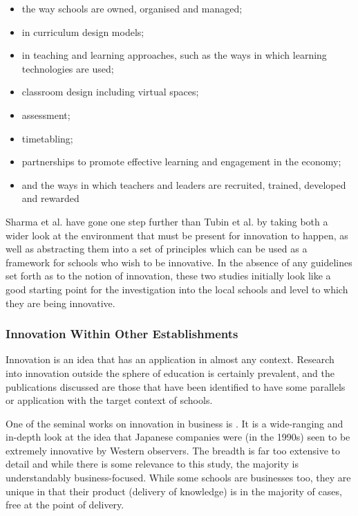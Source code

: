 \documentclass[11pt]{article}
\begin{document}
\begin{itemize}
	\item the way schools are owned, organised and managed; 
	\item in curriculum design models; 
	\item in teaching and learning approaches, such as the ways in which learning technologies are used; 
	\item classroom design including virtual spaces; 
	\item assessment; 
	\item timetabling; 
	\item partnerships to promote effective learning and engagement in the economy; 
	\item and the ways in which teachers and leaders are recruited, trained, developed and rewarded
\end{itemize}

Sharma et al. have gone one step further than Tubin et al. by taking both a wider look at the environment that must be present for innovation to happen, as well as abstracting them into a set of principles which can be used as a framework for schools who wish to be innovative. In the absence of any guidelines set forth as to the notion of innovation, these two studies initially look like a good starting point for the investigation into the local schools and level to which they are being innovative.

\subsubsection{Innovation Within Other Establishments}
Innovation is an idea that has an application in almost any context. Research into innovation outside the sphere of education is certainly prevalent, and the publications discussed are those that have been identified to have some parallels or application with the target context of schools.

One of the seminal works on innovation in business is \citet{nonaka1995knowledge}. It is a wide-ranging and in-depth look at the idea that Japanese companies were (in the 1990s) seen to be extremely innovative by Western observers. The breadth is far too extensive to detail and while there is some relevance to this study, the majority is understandably business-focused. While some schools are businesses too, they are unique in that their product (delivery of knowledge) is in the majority of cases, free at the point of delivery.
\end{document}
